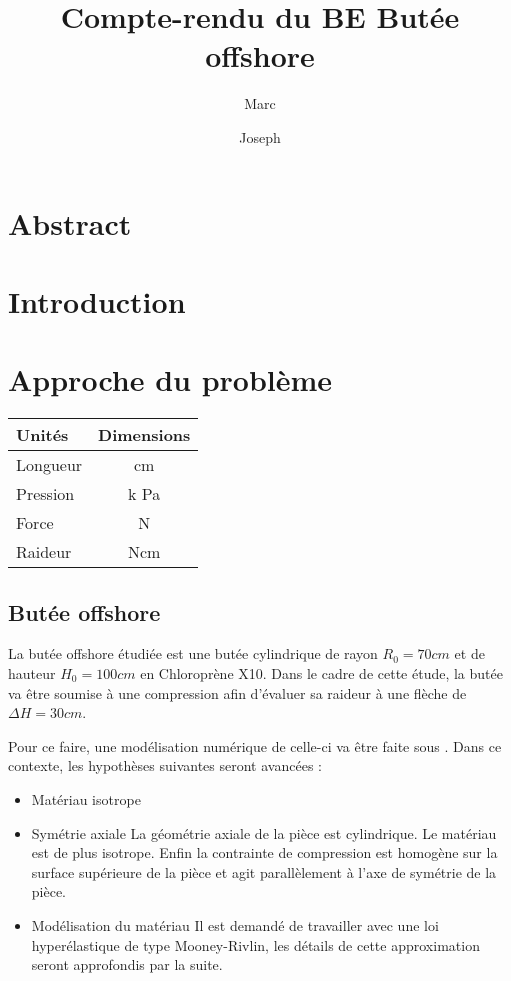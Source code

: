﻿\documentclass{article}
\title{Compte-rendu du BE Butée offshore}
\author{\bsc{Muller} Marc \and \bsc{Buquet} Joseph}
\newcommand{\abaqus}{\bsc{Abaqus}\xspace}
\begin{document}
\maketitle

\newpage

\section{Abstract}

\section{Introduction}




\section{Approche du problème}

\begin{tabular}{|l|c|}
\hline
Unités & Dimensions \\ \hline
Longueur & cm \\
Pression & k Pa \\
Force & N \\
Raideur & N\/cm \\ \hline
\end{tabular}

\subsection{Butée offshore}
La butée offshore étudiée est une butée cylindrique de rayon $R_0 = 70 cm$ et de hauteur $H_0 = 100 cm$ en Chloroprène X10. Dans le cadre de cette étude, la butée va être soumise à une compression afin d'évaluer sa raideur à une flèche de $\Delta H = 30 cm$.

Pour ce faire, une modélisation numérique de celle-ci va être faite sous \abaqus. Dans ce contexte, les hypothèses suivantes seront avancées :
\begin{itemize}
\item Matériau isotrope
\item Symétrie axiale
La géométrie axiale de la pièce est cylindrique. Le matériau est de plus isotrope. Enfin la contrainte de compression est homogène sur la surface supérieure de la pièce et agit parallèlement à l'axe de symétrie de la pièce.
\item Modélisation du matériau
Il est demandé de travailler avec une loi hyperélastique de type Mooney-Rivlin, les détails de cette approximation seront approfondis par la suite.
\end{itemize}
\end{document}
